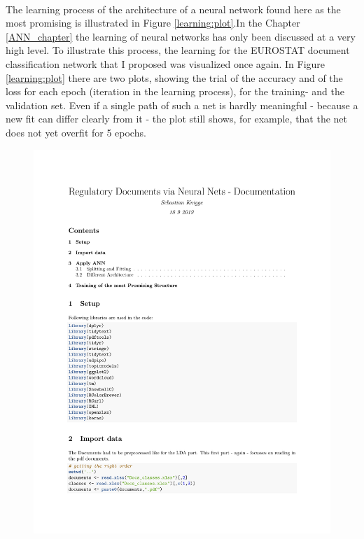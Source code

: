 \documentclass[11pt,a4paper]{article}
\begin{document}
\ \\
The learning process of the architecture of a neural network found here as the most promising is illustrated in Figure \ref{learning:plot}.In the Chapter \ref{ANN_chapter} the learning of neural networks has only been discussed at a very high level. To illustrate this process, the learning for the EUROSTAT document classification network that I proposed was visualized once again. In Figure \ref{learning:plot} there are two plots, showing the trial of the accuracy and of the loss for each epoch (iteration in the learning process), for the training- and the validation set. Even if a single path of such a net is hardly meaningful - because a new fit can differ clearly from it - the plot still shows, for example, that the net does not yet overfit for 5 epochs.\\
\begin{figure}[!htbp]
	\centering
	\includegraphics[page=8, trim=68 400 10 80,clip,width=1\textwidth]{ANN_RegDocs.pdf}

\end{figure}
\end{document}
